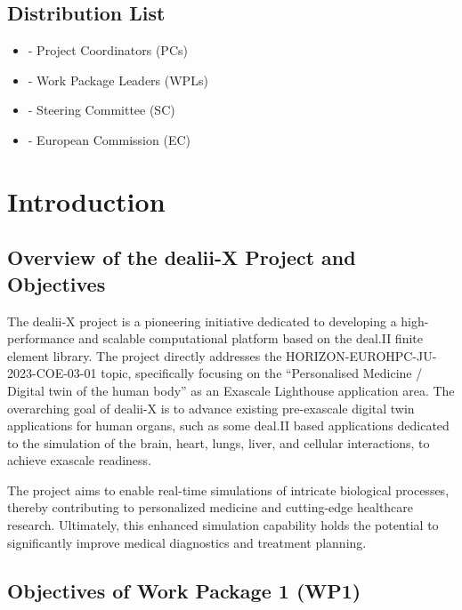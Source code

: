 \documentclass[a4paper,12pt]{article}
\begin{document}
\subsection*{{Distribution List}}
\begin{itemize}
    \item [] - Project Coordinators (PCs)
    \item [] - Work Package Leaders (WPLs)
    \item [] - Steering Committee (SC)
    \item [] - European Commission (EC)
\end{itemize}

\vspace*{2cm}

\disclaimer

\newpage

\tableofcontents %

\newpage

\section{Introduction}
    \subsection{Overview of the dealii-X Project and Objectives}

The dealii-X project is a pioneering initiative dedicated to developing a
high-perfor\-mance and scalable computational platform based on the deal.II finite
element library. The project directly addresses the
HORIZON-EUROHPC-JU-2023-COE-03-01 topic, specifically focusing on the
``Personalised Medicine / Digital twin of the human body'' as an Exascale
Lighthouse application area. The overarching goal of dealii-X is to advance
existing pre-exascale digital twin applications for human organs, such as some
deal.II based applications dedicated to the simulation of the brain, heart,
lungs, liver, and cellular interactions, to achieve exascale readiness. 

The project aims to enable real-time simulations of intricate biological
processes, thereby contributing to personalized medicine and cutting-edge
healthcare research. Ultimately, this enhanced simulation capability holds the
potential to significantly improve medical diagnostics and treatment planning.

\subsection{Objectives of Work Package 1 (WP1)}
\end{document}
